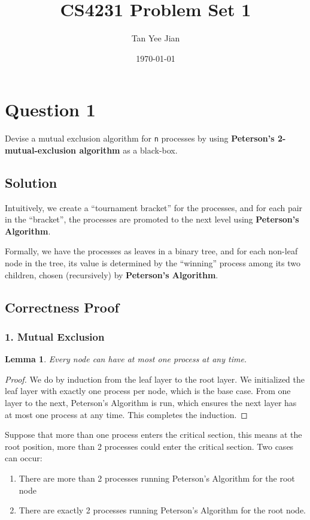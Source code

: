 \documentclass[11pt]{article}
\author{Tan Yee Jian}
\date{\today}
\title{CS4231 Problem Set 1}
\newtheorem{lemma}{Lemma}[section]
\begin{document}
\maketitle
\tableofcontents

\section{Question 1}
\label{sec:org6ac39ce}
Devise a mutual exclusion algorithm for \texttt{n} processes by using
\textbf{Peterson's 2-mutual-exclusion algorithm} as a black-box.
\subsection{Solution}
\label{sec:orgac2ced8}
Intuitively, we create a ``tournament bracket'' for the processes, and for each
pair in the ``bracket'', the processes are promoted to the next level using
\textbf{Peterson's Algorithm}.

Formally, we have the processes as leaves in a binary tree, and for each
non-leaf node in the tree, its value is determined by the ``winning'' process among its
two children, chosen (recursively) by \textbf{Peterson's Algorithm}.
\subsection{Correctness Proof}
\label{sec:orgb3464bb}
\subsubsection{1. Mutual Exclusion}
\label{sec:org2939db8}
\begin{lemma}
Every node can have at most one process at any time.
\end{lemma}
\begin{proof}
We do by induction from the leaf layer to the root layer. We initialized the
leaf layer with exactly one process per node, which is the base case. From one
layer to the next, Peterson's Algorithm is run, which ensures the next layer has
at most one process at any time. This completes the induction.
\end{proof}
Suppose that more than one process enters the critical section, this means at
the root position, more than 2 processes could enter the critical section. Two
cases can occur:
\begin{enumerate}
\item There are more than 2 processes running Peterson's Algorithm for the root
node
\item There are exactly 2 processes running Peterson's Algorithm for the root node.
\end{enumerate}
\end{document}
